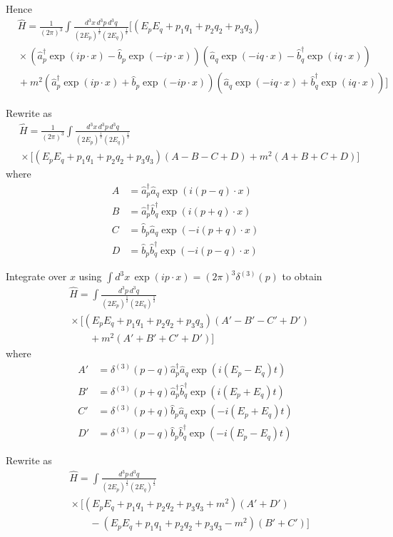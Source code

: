 \documentclass[12pt]{article}
\begin{document}
Hence
\begin{align*}
&\hat H=\frac{1}{(2\pi)^3}\int\frac{d^3x\,d^3p\,d^3q}{(2E_p)^\frac{1}{2}(2E_q)^\frac{1}{2}}
\bigg[
(E_pE_q+p_1q_1+p_2q_2+p_3q_3)
\\
&{}\times
\left(\hat a_p^\dag\exp(ip\cdot x)-\hat b_p\exp(-ip\cdot x)\right)
\left(\hat a_q\exp(-iq\cdot x)-\hat b_q^\dag\exp(iq\cdot x)\right)
\\
&{}+m^2
\left(\hat a_p^\dag\exp(ip\cdot x)+\hat b_p\exp(-ip\cdot x)\right)
\left(\hat a_q\exp(-iq\cdot x)+\hat b_q^\dag\exp(iq\cdot x)\right)
\bigg]
\end{align*}

Rewrite as
\begin{align*}
&\hat H=\frac{1}{(2\pi)^3}\int\frac{d^3x\,d^3p\,d^3q}{(2E_p)^\frac{1}{2}(2E_q)^\frac{1}{2}}
\\
&{}\times\bigg[(E_pE_q+p_1q_1+p_2q_2+p_3q_3)(A-B-C+D)+m^2(A+B+C+D)\bigg]
\end{align*}
where
\begin{align*}
A&=\hat a_p^\dag\hat a_q\exp(i(p-q)\cdot x)
\\
B&=\hat a_p^\dag\hat b_q^\dag\exp(i(p+q)\cdot x)
\\
C&=\hat b_p\hat a_q\exp(-i(p+q)\cdot x)
\\
D&=\hat b_p\hat b_q^\dag\exp(-i(p-q)\cdot x)
\end{align*}

Integrate over $x$ using $\int d^3x\,\exp(ip\cdot x)=(2\pi)^3\delta^{(3)}(p)$ to obtain
\begin{align*}
&\hat H
=\int\frac{d^3p\,d^3q}{(2E_p)^\frac{1}{2}(2E_q)^\frac{1}{2}}
\\
&{}\times\bigg[(E_pE_q+p_1q_1+p_2q_2+p_3q_3)(A'-B'-C'+D')
\\
&\qquad{}+m^2(A'+B'+C'+D')\bigg]
\end{align*}
where
\begin{align*}
A'&=\delta^{(3)}(p-q)\hat a_p^\dag\hat a_q\exp(i(E_p-E_q)t)
\\
B'&=\delta^{(3)}(p+q)\hat a_p^\dag\hat b_q^\dag\exp(i(E_p+E_q)t)
\\
C'&=\delta^{(3)}(p+q)\hat b_p\hat a_q\exp(-i(E_p+E_q)t)
\\
D'&=\delta^{(3)}(p-q)\hat b_p\hat b_q^\dag\exp(-i(E_p-E_q)t)
\end{align*}

Rewrite as
\begin{align*}
&\hat H=\int\frac{d^3p\,d^3q}{(2E_p)^\frac{1}{2}(2E_q)^\frac{1}{2}}
\\
&{}\times\bigg[(E_pE_q+p_1q_1+p_2q_2+p_3q_3+m^2)(A'+D')
\\
&\qquad{}-(E_pE_q+p_1q_1+p_2q_2+p_3q_3-m^2)(B'+C')\bigg]
\end{align*}
\end{document}
